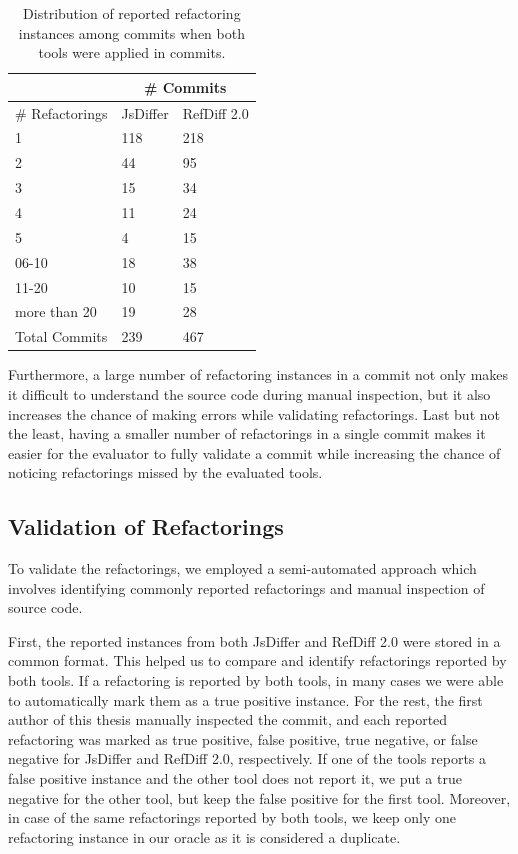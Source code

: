\documentclass[letterpaper,12pt,onecolumn,final]{report}
\begin{document}
\begin{table}[!ht]
    \centering
    \caption{Distribution of reported refactoring instances among commits when both tools were applied in \evTotalCommits{} commits.}
    \begin{tabular}{|l|l|l|}
    \hline
        & \multicolumn{2}{|c|}{\# Commits} \\ \hline
        \# Refactorings & JsDiffer & RefDiff 2.0 \\ \hline
        1 & 118 & 218 \\
        2 & 44 & 95 \\
        3 & 15 & 34 \\
        4 & 11 & 24 \\
        5 & 4 & 15 \\
        06-10 & 18 & 38 \\
        11-20 & 10 & 15 \\
        more than 20 & 19 & 28 \\ \hline
        Total Commits & 239 & 467 \\ \hline
    \end{tabular}
    \label{table:refcountrange}
\end{table}

Furthermore, a large number of refactoring instances in a commit not only makes it difficult to understand the source code during manual inspection, but it also increases the chance of making errors while validating refactorings. Last but not the least, having a smaller number of refactorings in a single commit makes it easier for the evaluator to fully validate a commit while increasing the chance of noticing refactorings missed by the evaluated tools. 

\subsection {Validation of Refactorings}
To validate the refactorings, we employed a semi-automated approach which involves identifying commonly reported refactorings and manual inspection of source code.


First, the reported instances from both JsDiffer and RefDiff 2.0 were stored in a common format. This helped us to compare and identify refactorings reported by both tools. If a refactoring is reported by both tools, in many cases we were able to automatically mark them as a true positive instance. For the rest, the first author of this thesis manually inspected the commit, and each reported refactoring was marked as true positive, false positive, true negative, or false negative for JsDiffer and RefDiff 2.0, respectively. If one of the tools reports a false positive instance and the other tool does not report it, we put a true negative for the other tool, but keep the false positive for the first tool. Moreover, in case of the same refactorings reported by both tools, we keep only one refactoring instance in our oracle as it is considered a duplicate.
\end{document}
